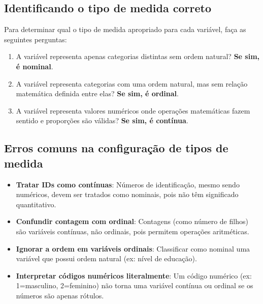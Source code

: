 
\subsection{Identificando o tipo de medida correto}

Para determinar qual o tipo de medida apropriado para cada variável, faça as seguintes perguntas:

\begin{enumerate}
    \item A variável representa apenas categorias distintas sem ordem natural? \textbf{Se sim, é nominal}.
    \item A variável representa categorias com uma ordem natural, mas sem relação matemática definida entre elas? \textbf{Se sim, é ordinal}.
    \item A variável representa valores numéricos onde operações matemáticas fazem sentido e proporções são válidas? \textbf{Se sim, é contínua}.
\end{enumerate}

\subsection{Erros comuns na configuração de tipos de medida}

\begin{itemize}
    \item \textbf{Tratar IDs como contínuas}: Números de identificação, mesmo sendo numéricos, devem ser tratados como nominais, pois não têm significado quantitativo.
    \item \textbf{Confundir contagem com ordinal}: Contagens (como número de filhos) são variáveis contínuas, não ordinais, pois permitem operações aritméticas.
    \item \textbf{Ignorar a ordem em variáveis ordinais}: Classificar como nominal uma variável que possui ordem natural (ex: nível de educação).
    \item \textbf{Interpretar códigos numéricos literalmente}: Um código numérico (ex: 1=masculino, 2=feminino) não torna uma variável contínua ou ordinal se os números são apenas rótulos.
\end{itemize}

